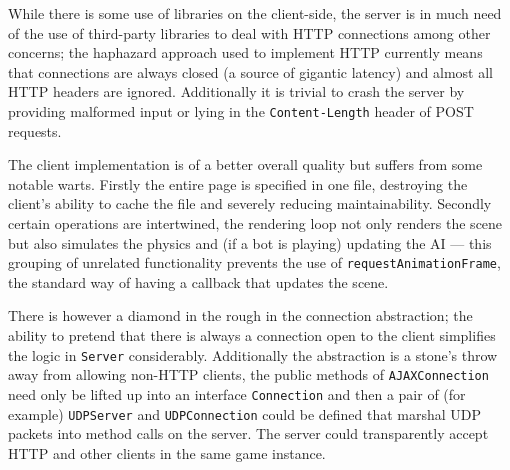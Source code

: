 \documentclass{article}
\begin{document}
While there is some use of libraries on the client-side, the server is in much
need of the use of third-party libraries to deal with HTTP connections among other
concerns; the haphazard approach used to implement HTTP currently means that
connections are always closed (a source of gigantic latency) and almost all
HTTP headers are ignored.  Additionally it is trivial to crash the server by
providing malformed input or lying in the \texttt{Content-Length} header of
POST requests.

The client implementation is of a better overall quality but suffers from some
notable warts.  Firstly the entire page is specified in one file, destroying the
client's ability to cache the file and severely reducing maintainability.  Secondly
certain operations are intertwined, the rendering loop not only renders the scene
but also simulates the physics and (if a bot is playing) updating the AI --- this
grouping of unrelated functionality prevents the use of \texttt{requestAnimationFrame},
the standard way of having a callback that updates the scene.

There is however a diamond in the rough in the connection abstraction; the ability
to pretend that there is always a connection open to the client simplifies the
logic in \texttt{Server} considerably.  Additionally the abstraction is a stone's
throw away from allowing non-HTTP clients, the public methods of \texttt{AJAXConnection}
need only be lifted up into an interface \texttt{Connection} and then a pair of
(for example) \texttt{UDPServer} and \texttt{UDPConnection} could be defined that
marshal UDP packets into method calls on the server.  The server could transparently
accept HTTP and other clients in the same game instance.
\end{document}
